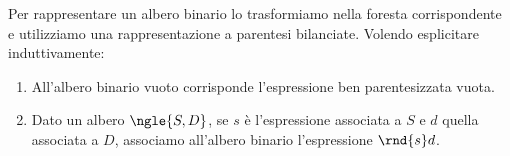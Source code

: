 \documentclass[\main/main.tex]{subfiles}
\begin{document}
\begin{definition}
    Per rappresentare un albero binario lo trasformiamo nella foresta corrispondente e utilizziamo una rappresentazione a parentesi bilanciate. Volendo esplicitare induttivamente:
    \begin{enumerate}
        \item All'albero binario vuoto corrisponde l'espressione ben parentesizzata vuota.
        \item Dato un albero \(\ngle{S, D}\), se \(s\) è l'espressione associata a \(S\) e \(d\) quella associata a \(D\), associamo all'albero binario l'espressione \(\rnd{s}d\).
    \end{enumerate}
\end{definition}
\end{document}
